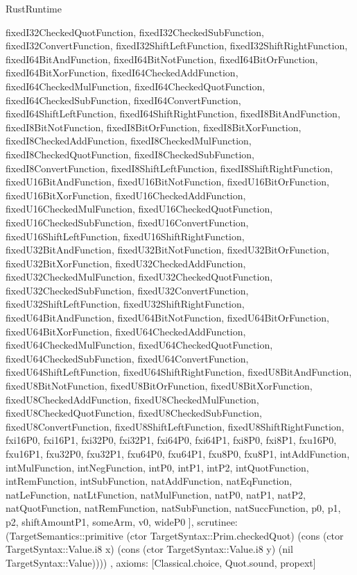 \begin{lexlean}{RustRuntime}
\begin{semanticmodule}
{{      fixedI32CheckedQuotFunction,
      fixedI32CheckedSubFunction,
      fixedI32ConvertFunction,
      fixedI32ShiftLeftFunction,
      fixedI32ShiftRightFunction,
      fixedI64BitAndFunction,
      fixedI64BitNotFunction,
      fixedI64BitOrFunction,
      fixedI64BitXorFunction,
      fixedI64CheckedAddFunction,
      fixedI64CheckedMulFunction,
      fixedI64CheckedQuotFunction,
      fixedI64CheckedSubFunction,
      fixedI64ConvertFunction,
      fixedI64ShiftLeftFunction,
      fixedI64ShiftRightFunction,
      fixedI8BitAndFunction,
      fixedI8BitNotFunction,
      fixedI8BitOrFunction,
      fixedI8BitXorFunction,
      fixedI8CheckedAddFunction,
      fixedI8CheckedMulFunction,
      fixedI8CheckedQuotFunction,
      fixedI8CheckedSubFunction,
      fixedI8ConvertFunction,
      fixedI8ShiftLeftFunction,
      fixedI8ShiftRightFunction,
      fixedU16BitAndFunction,
      fixedU16BitNotFunction,
      fixedU16BitOrFunction,
      fixedU16BitXorFunction,
      fixedU16CheckedAddFunction,
      fixedU16CheckedMulFunction,
      fixedU16CheckedQuotFunction,
      fixedU16CheckedSubFunction,
      fixedU16ConvertFunction,
      fixedU16ShiftLeftFunction,
      fixedU16ShiftRightFunction,
      fixedU32BitAndFunction,
      fixedU32BitNotFunction,
      fixedU32BitOrFunction,
      fixedU32BitXorFunction,
      fixedU32CheckedAddFunction,
      fixedU32CheckedMulFunction,
      fixedU32CheckedQuotFunction,
      fixedU32CheckedSubFunction,
      fixedU32ConvertFunction,
      fixedU32ShiftLeftFunction,
      fixedU32ShiftRightFunction,
      fixedU64BitAndFunction,
      fixedU64BitNotFunction,
      fixedU64BitOrFunction,
      fixedU64BitXorFunction,
      fixedU64CheckedAddFunction,
      fixedU64CheckedMulFunction,
      fixedU64CheckedQuotFunction,
      fixedU64CheckedSubFunction,
      fixedU64ConvertFunction,
      fixedU64ShiftLeftFunction,
      fixedU64ShiftRightFunction,
      fixedU8BitAndFunction,
      fixedU8BitNotFunction,
      fixedU8BitOrFunction,
      fixedU8BitXorFunction,
      fixedU8CheckedAddFunction,
      fixedU8CheckedMulFunction,
      fixedU8CheckedQuotFunction,
      fixedU8CheckedSubFunction,
      fixedU8ConvertFunction,
      fixedU8ShiftLeftFunction,
      fixedU8ShiftRightFunction,
      fxi16P0,
      fxi16P1,
      fxi32P0,
      fxi32P1,
      fxi64P0,
      fxi64P1,
      fxi8P0,
      fxi8P1,
      fxu16P0,
      fxu16P1,
      fxu32P0,
      fxu32P1,
      fxu64P0,
      fxu64P1,
      fxu8P0,
      fxu8P1,
      intAddFunction,
      intMulFunction,
      intNegFunction,
      intP0,
      intP1,
      intP2,
      intQuotFunction,
      intRemFunction,
      intSubFunction,
      natAddFunction,
      natEqFunction,
      natLeFunction,
      natLtFunction,
      natMulFunction,
      natP0,
      natP1,
      natP2,
      natQuotFunction,
      natRemFunction,
      natSubFunction,
      natSuccFunction,
      p0,
      p1,
      p2,
      shiftAmountP1,
      someArm,
      v0,
      wideP0
    ],
    scrutinee: (TargetSemantics::primitive (ctor TargetSyntax::Prim.checkedQuot) (cons (ctor TargetSyntax::Value.i8 x) (cons (ctor TargetSyntax::Value.i8 y) (nil TargetSyntax::Value))))
  },
  axioms: [Classical.choice, Quot.sound, propext]
}


\end{semanticmodule}
\end{lexlean}
